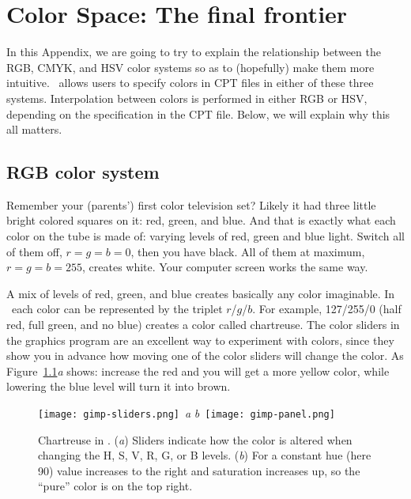 %
%
\chapter{Color Space: The final frontier}
\label{app:I}


In this Appendix, we are going to try to explain the relationship
between the RGB, CMYK, and HSV color systems so as to (hopefully) make
them more intuitive.  \GMT\ allows users to specify colors in CPT
files in either of these three systems. Interpolation between colors is performed in either RGB or HSV, depending on the specification in the CPT file. Below, we will explain why this all matters.

\section{RGB color system}
Remember your (parents') first color television set? Likely it had three little bright colored squares on it: red, green, and blue. And that is exactly what each color on the tube is made of: varying levels of red, green and blue light. Switch all of them off, $r=g=b=0$, then you have black. All of them at maximum, $r=g=b=255$, creates white. Your computer screen works the same way.

A mix of levels of red, green, and blue creates basically any color imaginable. In \GMT\ each color can be represented by the triplet $r$/$g$/$b$. For example, 127/255/0 (half red, full green, and no blue) creates a color called chartreuse. The color sliders in the graphics program  are an excellent way to experiment with colors, since they show you in advance how moving one of the color sliders will change the color. As Figure~\ref{fig:gimp}\emph{a} shows: increase the red and you will get a more yellow color, while lowering the blue level will turn it into brown.

\begin{figure}[b]
   \texttt{[image: gimp-sliders.png]}~\emph{a}\hfill
   \emph{b}~\texttt{[image: gimp-panel.png]}
   \caption{Chartreuse in \protect{}. (\emph{a}) Sliders indicate how the color is altered when changing the H, S, V, R, G, or B levels. (\emph{b}) For a constant hue (here 90\DS) value increases to the right and saturation increases up, so the ``pure'' color is on the top right.}
   \label{fig:gimp}
\end{figure}

